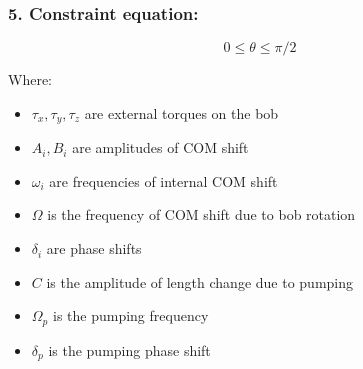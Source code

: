 \documentclass{article}
\begin{document}
\subsubsection{5. Constraint equation:}
\begin{equation*}
0 \leq \theta \leq \pi/2
\end{equation*}

Where:
\begin{itemize}
    \item $\tau_x, \tau_y, \tau_z$ are external torques on the bob
    \item $A_i, B_i$ are amplitudes of COM shift
    \item $\omega_i$ are frequencies of internal COM shift
    \item $\Omega$ is the frequency of COM shift due to bob rotation
    \item $\delta_i$ are phase shifts
    \item $C$ is the amplitude of length change due to pumping
    \item $\Omega_p$ is the pumping frequency
    \item $\delta_p$ is the pumping phase shift
\end{itemize}
\end{document}
